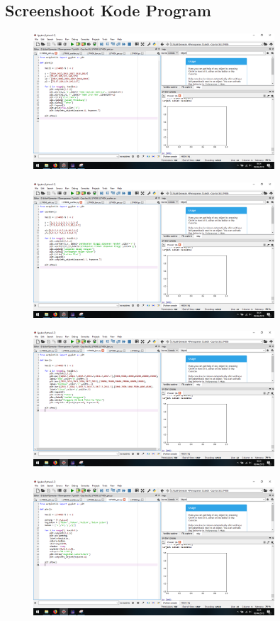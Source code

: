 \subsection{Screenshoot Kode Program}
\begin{figure}[H]
	\includegraphics[width=9cm]{figures/6/Praktek/1174039/c1.png}
	\centering
\end{figure}
\begin{figure}[H]
	\includegraphics[width=9cm]{figures/6/Praktek/1174039/c2.png}
	\centering
\end{figure}
\begin{figure}[H]
	\includegraphics[width=9cm]{figures/6/Praktek/1174039/c3.png}
	\centering
\end{figure}
\begin{figure}[H]
	\includegraphics[width=9cm]{figures/6/Praktek/1174039/c4.png}
	\centering
\end{figure}
